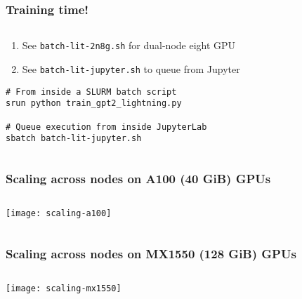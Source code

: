 \documentclass[
	notes=none,
	aspectratio=169
]{beamer}
\begin{document}

\begin{frame}[fragile]
\frametitle{Training time!}

\begin{columns}[T]
\begin{column}[T]{1.0\textwidth}
\setlength{\parskip}{0.5em}

\vspace{0.0cm}
\begin{enumerate}
\setlength{\parskip}{0.5em}
\item See {\tt batch-lit-2n8g.sh} for dual-node eight GPU
\item See {\tt batch-lit-jupyter.sh} to queue from Jupyter
\end{enumerate}

\begin{lstlisting}[backgroundcolor = \color{darkgray},language=shell]
# From inside a SLURM batch script
srun python train_gpt2_lightning.py

# Queue execution from inside JupyterLab
sbatch batch-lit-jupyter.sh
\end{lstlisting}

\end{column}
\end{columns}

\end{frame}
\note{
}


\begin{frame}
\frametitle{Scaling across nodes on A100 (40 GiB) GPUs}

\begin{columns}[T]
\begin{column}[T]{1.0\textwidth}
\setlength{\parskip}{0.5em}

\vspace{-1.5cm}
\texttt{[image: scaling-a100]}


\end{column}
\end{columns}

\end{frame}
\note{
}


\begin{frame}
\frametitle{Scaling across nodes on MX1550 (128 GiB) GPUs}

\begin{columns}[T]
\begin{column}[T]{1.0\textwidth}
\setlength{\parskip}{0.5em}

\vspace{-1.5cm}
\texttt{[image: scaling-mx1550]}


\end{column}
\end{columns}

\end{frame}
\note{
}
\end{document}
